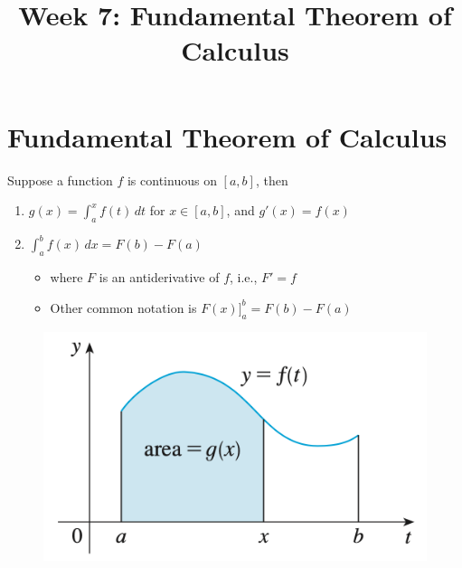 \documentclass[t]{beamer}
\title{Week 7:  Fundamental Theorem of Calculus}
\theoremstyle{plain}
\theoremstyle{definition}
\newcommand{\ds}{\displaystyle}
\newcommand{\dx}{\,dx}
\begin{document}
\frame{\titlepage}

\setcounter{tocdepth}{2}
\frame{\tableofcontents

}



\section{Fundamental Theorem of Calculus}

\begin{frame}
\begin{theorem}
Suppose a function $f$ is continuous on $[a,b]$, then
\begin{enumerate}
\item $g(x)=\ds\int^x_af(t)\,dt$ for $x\in [a,b]$, and $g'(x)=f(x)$
\item $\ds\int_a^bf(x)\dx=F(b)-F(a)$
\begin{itemize}
	\item where $F$ is an antiderivative of $f$,  i.e., $F' = f$
	\item Other common notation is $F(x)\big]_{a}^{b}= F(b) - F(a)$
\end{itemize}
\end{enumerate}
\end{theorem}

\begin{figure}
\begin{center}
\includegraphics[scale=0.27]{fig/ftc0}
\end{center}
\end{figure}

\end{frame}
\end{document}
